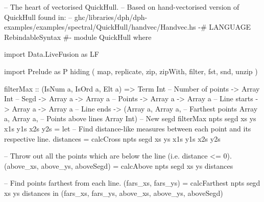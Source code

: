 \documentclass[preamble.tex]{subfiles}
\begin{document}
\clearpage
\begin{hscode}
-- The heart of vectorised QuickHull.
-- Based on hand-vectorised version of QuickHull found in:
-- ghc/libraries/dph/dph-examples/examples/spectral/QuickHull/handvec/Handvec.hs
{-# LANGUAGE RebindableSyntax #-}
module QuickHull where

import Data.LiveFusion as LF

import Prelude as P hiding ( map, replicate, zip, zipWith,
                             filter, fst, snd, unzip )

filterMax :: (IsNum a, IsOrd a, Elt a)
          => Term Int            -- Number of points
          -> Array Int           -- Segd
          -> Array a -> Array a  -- Points
          -> Array a -> Array a  -- Line starts
          -> Array a -> Array a  -- Line ends
          -> (Array a, Array a,  -- Farthest points
              Array a, Array a,  -- Points above lines
              Array Int)         -- New segd
filterMax npts segd xs ys x1s y1s x2s y2s
  = let -- Find distance-like measures between each point and its respective line.
        distances = calcCross npts segd xs ys x1s y1s x2s y2s

        -- Throw out all the points which are below the line (i.e. distance <= 0).
        (above_xs, above_ys, aboveSegd) = calcAbove npts segd xs ys distances

        -- Find points farthest from each line.
        (fars_xs, fars_ys) = calcFarthest npts segd xs ys distances
    in  (fars_xs, fars_ys, above_xs, above_ys, aboveSegd)


\end{hscode}
\end{document}
